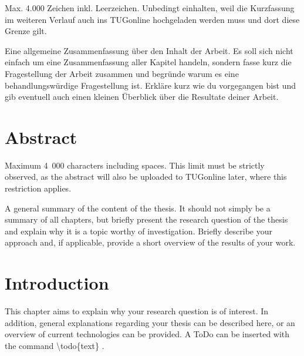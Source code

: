 \documentclass[a4paper, fleqn, headsepline, footsepline, 12pt, parskip=half]{scrartcl}
\begin{document}
Max. 4.000 Zeichen inkl. Leerzeichen. Unbedingt einhalten, weil die Kurzfassung im weiteren Verlauf auch ins TUGonline hochgeladen werden muss und dort diese Grenze gilt.

Eine allgemeine Zusammenfassung über den Inhalt der Arbeit. Es soll sich nicht einfach um eine Zusammenfassung aller Kapitel handeln, sondern fasse kurz die Fragestellung der Arbeit zusammen und begründe warum es eine behandlungswürdige Fragestellung ist. Erkläre kurz wie du vorgegangen bist und gib eventuell auch einen kleinen Überblick über die Resultate deiner Arbeit.

\newpage

\section*{Abstract} %

Maximum 4~000 characters including spaces. This limit must be strictly observed, as the abstract will also be uploaded to TUGonline later, where this restriction applies.

A general summary of the content of the thesis. It should not simply be a summary of all chapters, but briefly present the research question of the thesis and explain why it is a topic worthy of investigation. Briefly describe your approach and, if applicable, provide a short overview of the results of your work.

\newpage

\tableofcontents
\pagebreak


\pagestyle{headings}

\newpage
\section{Introduction}
\label{sec:introduction}

This chapter aims to explain why your research question is of interest. In addition, general explanations regarding your thesis can be described here, or an overview of current technologies can be provided. A ToDo can be inserted with the command \textbackslash todo\{text\} .
\end{document}
